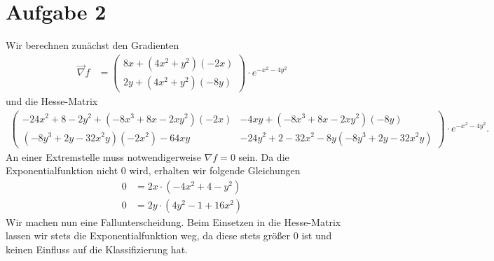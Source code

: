 \documentclass{article}
\theoremstyle{definition}
\begin{document}
\section*{Aufgabe 2}
Wir berechnen zunächst den Gradienten
\begin{align*}
	\vec{\nabla} f &= \begin{pmatrix}
		8x + (4x^2 + y^2)(-2x)\\
		2y + (4x^2+y^2)(-8y)
	\end{pmatrix}\cdot e^{-x^2-4y^2}
\end{align*}
und die Hesse-Matrix
\begin{align*}
	\begin{pmatrix}
		-24x^2 + 8 - 2y^2 + (-8x^3 + 8x - 2xy^2)(-2x) & -4xy + (-8x^3 + 8x - 2xy^2)(-8y)\\
		(-8y^3 + 2y - 32x^2y)(-2x^2) - 64xy & -24y^2 + 2 - 32x^2 - 8y(-8y^3 + 2y - 32x^2y)
	\end{pmatrix}\cdot e^{-x^2-4y^2}.
\end{align*}
An einer Extremstelle muss notwendigerweise $\nabla f = 0$ sein. 
Da die Exponentialfunktion nicht 0 wird, erhalten wir folgende Gleichungen
\begin{align*}
	0 &= 2x \cdot (-4x^2 + 4 - y^2)\\
	0 &= 2y \cdot (4y^2 - 1 + 16x^2)
\end{align*}
Wir machen nun eine Fallunterscheidung. Beim Einsetzen in die Hesse-Matrix lassen wir stets die Exponentialfunktion weg, da diese stets größer 0 ist und keinen Einfluss auf die Klassifizierung hat.
\end{document}
